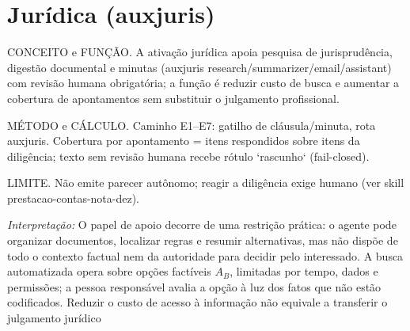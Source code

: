 \section{Jurídica (auxjuris)}
\begin{descricao}
CONCEITO e FUNÇÃO. A ativação jurídica apoia pesquisa de jurisprudência,
digestão documental e minutas (auxjuris research/summarizer/email/assistant) com
revisão humana obrigatória; a função é reduzir custo de busca e aumentar a
cobertura de apontamentos sem substituir o julgamento profissional.
\end{descricao}
\begin{metodo}
MÉTODO e CÁLCULO. Caminho E1--E7: gatilho de cláusula/minuta, rota auxjuris.
Cobertura por apontamento = itens respondidos sobre itens da diligência; texto
sem revisão humana recebe rótulo `rascunho` (fail-closed).
\end{metodo}
\begin{aviso}
LIMITE. Não emite parecer autônomo; reagir a diligência exige humano (ver
skill prestacao-contas-nota-dez).
\end{aviso}
\noindent\textit{Interpretação:} O papel de apoio decorre de uma restrição prática: o agente pode organizar documentos, localizar regras e resumir alternativas, mas não dispõe de todo o contexto factual nem da autoridade para decidir pelo interessado. A busca automatizada opera sobre opções factíveis $A_B$, limitadas por tempo, dados e permissões; a pessoa responsável avalia a opção à luz dos fatos que não estão codificados. Reduzir o custo de acesso à informação não equivale a transferir o julgamento jurídico  %
